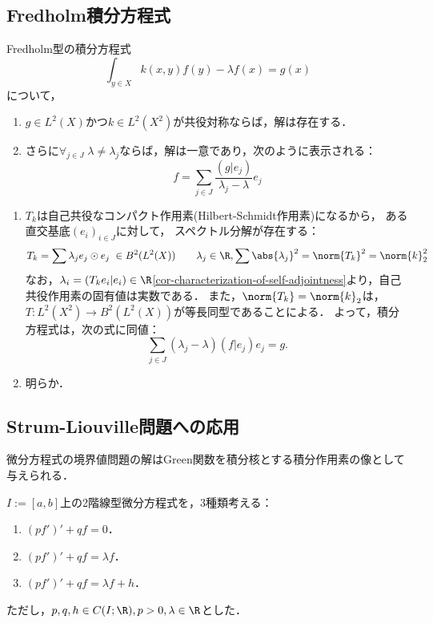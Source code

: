 \documentclass[uplatex,dvipdfmx]{jsreport}
\begin{document}
\subsection{Fredholm積分方程式}

\begin{proposition}
    Fredholm型の積分方程式
    \[\int_{y\in X}k(x,y)f(y)-\lambda f(x)=g(x)\]
    について，
    \begin{enumerate}
        \item $g\in L^2(X)$かつ$k\in L^2(X^2)$が共役対称ならば，解は存在する．
        \item さらに$\forall_{j\in J}\;\lambda\ne\lambda_j$ならば，解は一意であり，次のように表示される：
        \[f=\sum_{j\in J}\frac{(g|e_j)}{\lambda_j-\lambda}e_j\]
    \end{enumerate}
\end{proposition}
\begin{Proof}\mbox{}
    \begin{enumerate}
        \item $T_k$は自己共役なコンパクト作用素(Hilbert-Schmidt作用素)になるから，
        ある直交基底$(e_i)_{i\in J}$に対して，
        スペクトル分解が存在する：
        \[T_k=\sum\lambda_je_j\odot e_j\;\in B^2(L^2(X))\qquad\lambda_j\in\R,\sum\abs{\lambda_j}^2=\norm{T_k}^2=\norm{k}^2_2\]
        なお，$\lambda_i=(T_ke_i|e_i)\in\R$\ref{cor-characterization-of-self-adjointness}より，自己共役作用素の固有値は実数である．
        また，$\norm{T_k}=\norm{k}_2$は，$T:L^2(X^2)\to B^2(L^2(X))$が等長同型であることによる．
        よって，積分方程式は，次の式に同値：
        \[\sum_{j\in J}(\lambda_j-\lambda)(f|e_j)e_j=g.\]
        \item 明らか．
    \end{enumerate}
\end{Proof}

\subsection{Strum-Liouville問題への応用}

\begin{tcolorbox}[colframe=ForestGreen, colback=ForestGreen!10!white,breakable,colbacktitle=ForestGreen!40!white,coltitle=black,fonttitle=\bfseries\sffamily,
title=]
    微分方程式の境界値問題の解はGreen関数を積分核とする積分作用素の像として与えられる．
\end{tcolorbox}

\begin{problem}
    $I:=[a,b]$上の2階線型微分方程式を，3種類考える：
    \begin{enumerate}
        \item $(pf')'+qf=0$．
        \item $(pf')'+qf=\lambda f$．
        \item $(pf')'+qf=\lambda f+h$．
    \end{enumerate}
    ただし，$p,q,h\in C(I;\R),p>0,\lambda\in\R$とした．
\end{problem}
\end{document}
